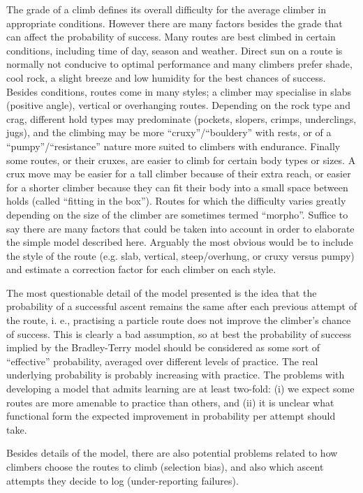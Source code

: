 \documentclass{article}
\begin{document}
The grade of a climb defines its overall difficulty for the average climber in appropriate conditions. However there are many factors besides the grade that can affect the probability of success. Many routes are best climbed in certain conditions, including time of day, season and weather. Direct sun on a route is normally not conducive to optimal performance and many climbers prefer shade, cool rock, a slight breeze and low humidity for the best chances of success. Besides conditions, routes come in many styles; a climber may specialise in slabs (positive angle), vertical or overhanging routes. Depending on the rock type and crag, different hold types may predominate (pockets, slopers, crimps, underclings, jugs), and the climbing may be more ``cruxy''/``bouldery'' with rests, or of a ``pumpy''/``resistance'' nature more suited to climbers with endurance. Finally some routes, or their cruxes, are easier to climb for certain body types or sizes. A crux move may be easier for a tall climber because of their extra reach, or easier for a shorter climber because they can fit their body into a small space between holds (called ``fitting in the box''). Routes for which the difficulty varies greatly depending on the size of the climber are sometimes termed ``morpho''. Suffice to say there are many factors that could be taken into account in order to elaborate the simple model described here. Arguably the most obvious would be to include the style of the route (e.g. slab, vertical, steep/overhung, or cruxy versus pumpy) and estimate a correction factor for each climber on each style. 

The most questionable detail of the model presented is the idea that the probability of a successful ascent remains the same after each previous attempt of the route, i. e., practising a particle route does not improve the climber's chance of success. This is clearly a bad assumption, so at best the probability of success implied by the Bradley-Terry model should be considered as some sort of ``effective'' probability, averaged over different levels of practice. The real underlying probability is probably increasing with practice. The problems with developing a model that admits learning are at least two-fold: (i) we expect some routes are more amenable to practice than others, and (ii) it is unclear what functional form the expected improvement in probability per attempt should take.

Besides details of the model, there are also potential problems related to how climbers choose the routes to climb (selection bias), and also which ascent attempts they decide to log (under-reporting failures). 
\end{document}
